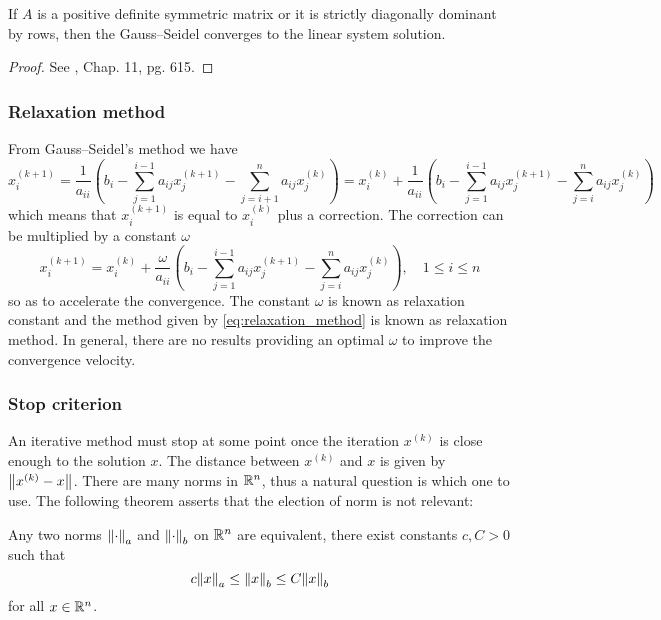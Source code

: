 \begin{theorem}
    If $A$ is a positive definite symmetric matrix or it is strictly diagonally
    dominant by rows, then the Gauss--Seidel converges to the linear system
    solution.
\end{theorem}
\begin{proof}
    See \cite{golub2013matrix}, Chap. 11, pg. 615.
\end{proof}

\subsubsection{Relaxation method}

From Gauss--Seidel's method we have
\begin{equation*}
    x_i^{(k+1)} = 
    \frac{1}{a_{ii}} 
    \left( b_i - \sum_{j=1}^{i-1} a_{ij} x_j^{(k+1)} - \sum_{j=i+1}^{n} a_{ij} x_j^{(k)} \right) =
    x_i^{(k)} + 
    \frac{1}{a_{ii}} \left( b_i - \sum_{j=1}^{i-1} a_{ij} x_j^{(k+1)} - \sum_{j=i}^{n} a_{ij} x_j^{(k)} \right)
\end{equation*}
which means that $x_i^{(k+1)}$ is equal to $x_i^{(k)}$ plus a correction. The
correction can be multiplied by a constant $\omega$
\begin{equation} \label{eq:relaxation_method}
    x_i^{(k+1)} = 
    x_i^{(k)} + 
    \frac{\omega}{a_{ii}} \left( b_i - \sum_{j=1}^{i-1} a_{ij} x_j^{(k+1)} - \sum_{j=i}^{n} a_{ij} x_j^{(k)} \right),
    \quad 1 \leq i \leq n
\end{equation}
so as to accelerate the convergence. The constant $\omega$ is known as
relaxation constant and the method given by \eqref{eq:relaxation_method} is
known as relaxation method. In general, there are no results providing an
optimal $\omega$ to improve the convergence velocity.

\subsubsection{Stop criterion}

An iterative method must stop at some point once the iteration $x^{(k)}$ is
close enough to the solution $x$. The distance between $x^{(k)}$ and $x$ is
given by $\norm{x^{(k)} - x}$. There are many norms in $\mathbb{R}^n$, thus a natural
question is which one to use. The following theorem asserts that the election of
norm is not relevant:

\begin{theorem}
    Any two norms $\norm{\cdot}_a$ and $\norm{\cdot}_b$ on $\mathbb{R}^n$ are
    equivalent, \ie there exist constants $c, C > 0$ such that
    \begin{equation*}
        c \norm{x}_a \leq \norm{x}_b \leq C \norm{x}_b
    \end{equation*}
    for all $x \in \mathbb{R}^n$.
\end{theorem}

